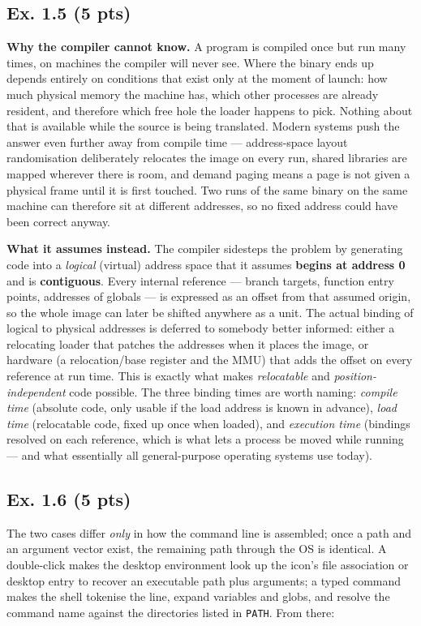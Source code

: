 \subsection*{Ex. 1.5 (5 pts)}

\textbf{Why the compiler cannot know.} A program is compiled once but run many times, on
machines the compiler will never see. Where the binary ends up depends entirely on
conditions that exist only at the moment of launch: how much physical memory the machine
has, which other processes are already resident, and therefore which free hole the loader
happens to pick. Nothing about that is available while the source is being translated.
Modern systems push the answer even further away from compile time --- address-space
layout randomisation deliberately relocates the image on every run, shared libraries are
mapped wherever there is room, and demand paging means a page is not given a physical
frame until it is first touched. Two runs of the same binary on the same machine can
therefore sit at different addresses, so no fixed address could have been correct anyway.

\textbf{What it assumes instead.} The compiler sidesteps the problem by generating code
into a \emph{logical} (virtual) address space that it assumes \textbf{begins at address
0} and is \textbf{contiguous}. Every internal reference --- branch targets, function
entry points, addresses of globals --- is expressed as an offset from that assumed
origin, so the whole image can later be shifted anywhere as a unit. The actual binding of
logical to physical addresses is deferred to somebody better informed: either a
relocating loader that patches the addresses when it places the image, or hardware (a
relocation/base register and the MMU) that adds the offset on every reference at run
time. This is exactly what makes \emph{relocatable} and \emph{position-independent} code
possible. The three binding times are worth naming: \emph{compile time} (absolute code,
only usable if the load address is known in advance), \emph{load time} (relocatable code,
fixed up once when loaded), and \emph{execution time} (bindings resolved on each
reference, which is what lets a process be moved while running --- and what essentially
all general-purpose operating systems use today).

\subsection*{Ex. 1.6 (5 pts)}

The two cases differ \emph{only} in how the command line is assembled; once a path and an
argument vector exist, the remaining path through the OS is identical. A double-click
makes the desktop environment look up the icon's file association or desktop entry to
recover an executable path plus arguments; a typed command makes the shell tokenise the
line, expand variables and globs, and resolve the command name against the directories
listed in \texttt{PATH}.
From there:

